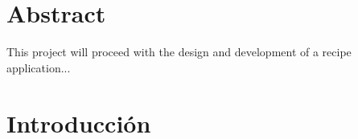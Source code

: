 \documentclass[twoside, openright, 11pt]{report}
\begin{document}
\chapter*{Abstract} %
\thispagestyle{empty}
This project will proceed with the design and development of a recipe application...

\tableofcontents %

\cleardoublepage
{} %
\listoffigures %

\cleardoublepage
{} %
\listoftables %

\chapter{Introducción}\label{cap.introduccion}
\end{document}
